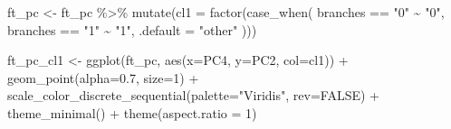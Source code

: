 \documentclass[
  letterpaper,
]{book}
\newenvironment{Shaded}{\begin{snugshade}}{\end{snugshade}}
\newcommand{\AttributeTok}[1]{\textcolor[rgb]{0.40,0.45,0.13}{#1}}
\newcommand{\ConstantTok}[1]{\textcolor[rgb]{0.56,0.35,0.01}{#1}}
\newcommand{\DecValTok}[1]{\textcolor[rgb]{0.68,0.00,0.00}{#1}}
\newcommand{\FloatTok}[1]{\textcolor[rgb]{0.68,0.00,0.00}{#1}}
\newcommand{\FunctionTok}[1]{\textcolor[rgb]{0.28,0.35,0.67}{#1}}
\newcommand{\NormalTok}[1]{\textcolor[rgb]{0.00,0.23,0.31}{#1}}
\newcommand{\OtherTok}[1]{\textcolor[rgb]{0.00,0.23,0.31}{#1}}
\newcommand{\SpecialCharTok}[1]{\textcolor[rgb]{0.37,0.37,0.37}{#1}}
\newcommand{\StringTok}[1]{\textcolor[rgb]{0.13,0.47,0.30}{#1}}
\begin{document}
\begin{Shaded}
\begin{Highlighting}[]
\NormalTok{ft\_pc }\OtherTok{\textless{}{-}}\NormalTok{ ft\_pc }\SpecialCharTok{\%\textgreater{}\%}
  \FunctionTok{mutate}\NormalTok{(}\AttributeTok{cl1 =} \FunctionTok{factor}\NormalTok{(}\FunctionTok{case\_when}\NormalTok{(}
\NormalTok{                 branches }\SpecialCharTok{==} \StringTok{"0"} \SpecialCharTok{\textasciitilde{}} \StringTok{"0"}\NormalTok{,}
\NormalTok{                 branches }\SpecialCharTok{==} \StringTok{"1"} \SpecialCharTok{\textasciitilde{}} \StringTok{"1"}\NormalTok{,}
                 \AttributeTok{.default =} \StringTok{"other"}
\NormalTok{  )))}
\end{Highlighting}
\end{Shaded}

\begin{Shaded}
\end{Shaded}

\begin{Shaded}
\begin{Highlighting}[]
\NormalTok{ft\_pc\_cl1 }\OtherTok{\textless{}{-}} \FunctionTok{ggplot}\NormalTok{(ft\_pc, }\FunctionTok{aes}\NormalTok{(}\AttributeTok{x=}\NormalTok{PC4, }\AttributeTok{y=}\NormalTok{PC2, }\AttributeTok{col=}\NormalTok{cl1)) }\SpecialCharTok{+}
  \FunctionTok{geom\_point}\NormalTok{(}\AttributeTok{alpha=}\FloatTok{0.7}\NormalTok{, }\AttributeTok{size=}\DecValTok{1}\NormalTok{) }\SpecialCharTok{+}
  \FunctionTok{scale\_color\_discrete\_sequential}\NormalTok{(}\AttributeTok{palette=}\StringTok{"Viridis"}\NormalTok{, }\AttributeTok{rev=}\ConstantTok{FALSE}\NormalTok{) }\SpecialCharTok{+}
  \FunctionTok{theme\_minimal}\NormalTok{() }\SpecialCharTok{+}
  \FunctionTok{theme}\NormalTok{(}\AttributeTok{aspect.ratio =} \DecValTok{1}\NormalTok{)}
\end{Highlighting}
\end{Shaded}
\end{document}
